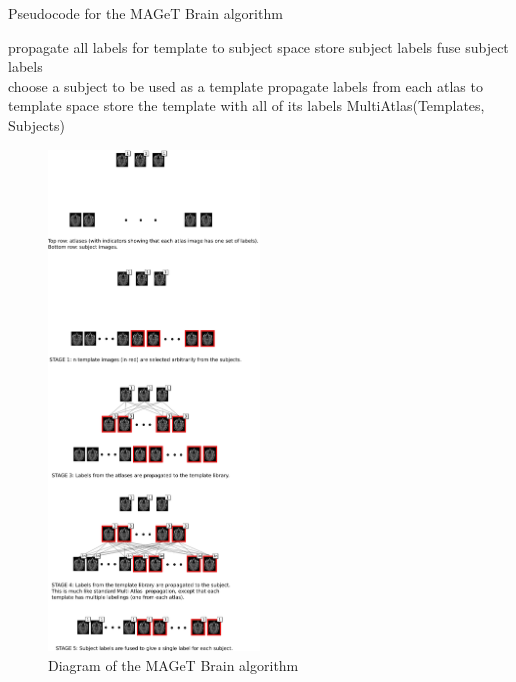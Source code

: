 \documentclass{article}\usepackage{graphicx, color}
\begin{document}
\begin{algorithm}
  \scriptsize
  \caption{Pseudocode for the MAGeT Brain algorithm}
  \label{pseudocodesdf}
  \begin{algorithmic}
          \State propagate all labels for template to subject space
          \State store subject labels
        \EndFor
        \State fuse subject labels
      \EndFor
    \EndFunction
    \\
        \State choose a subject to be used as a template
        \State propagate labels from each atlas to template space
        \State store the template with all of its labels
      \EndFor
      \State MultiAtlas(Templates, Subjects)
    \EndFunction
  \end{algorithmic}
\end{algorithm}


\begin{figure}[h]
  \centering
    \includegraphics[width=0.5\textwidth]{figure/MAGeT-figure.png}
  \caption{Diagram of the MAGeT Brain algorithm}
\end{figure}
\end{document}
